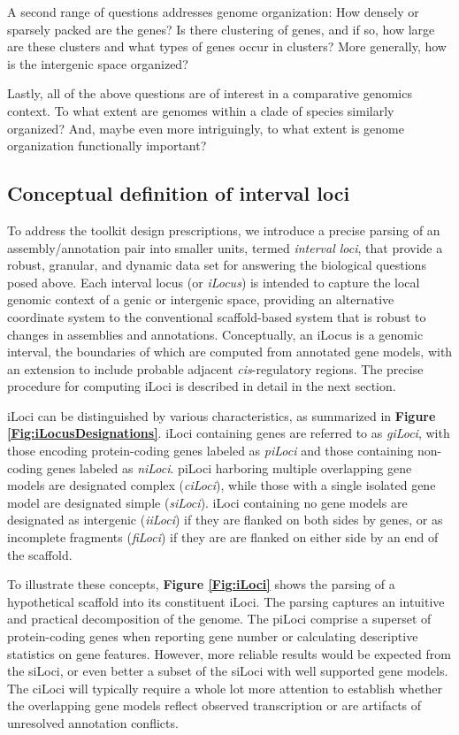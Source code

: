 A second range of questions addresses genome organization:
How densely or sparsely packed are the genes?
Is there clustering of genes, and if so, how large are these clusters and what types of genes occur in clusters?
More generally, how is the intergenic space organized?

Lastly, all of the above questions are of interest in a comparative genomics context.
To what extent are genomes within a clade of species similarly organized?
And, maybe even more intriguingly, to what extent is genome organization functionally important?


\subsection{Conceptual definition of interval loci}
To address the toolkit design prescriptions, we introduce a precise parsing of an assembly/annotation pair into smaller units, termed \textit{interval loci}, that provide a robust, granular, and dynamic data set for answering the biological questions posed above.
Each interval locus (or \textit{iLocus}) is intended to capture the local genomic context of a genic or intergenic space, providing an alternative coordinate system to the conventional scaffold-based system that is robust to changes in assemblies and annotations.
Conceptually, an iLocus is a genomic interval, the boundaries of which are computed from annotated gene models, with an extension to include probable adjacent \textit{cis}-regulatory regions.
The precise procedure for computing iLoci is described in detail in the next section.

iLoci can be distinguished by various characteristics, as summarized in \textbf{Figure \ref{Fig:iLocusDesignations}}.
iLoci containing genes are referred to as \textit{giLoci}, with those encoding protein-coding genes labeled as \textit{piLoci} and those containing non-coding genes labeled as \textit{niLoci}.
piLoci harboring multiple overlapping gene models are designated complex (\textit{ciLoci}), while those with a single isolated gene model are designated simple (\textit{siLoci}).
iLoci containing no gene models are designated as intergenic (\textit{iiLoci}) if they are flanked on both sides by genes, or as incomplete fragments (\textit{fiLoci}) if they are are flanked on either side by an end of the scaffold.

To illustrate these concepts, \textbf{Figure \ref{Fig:iLoci}} shows the parsing of a hypothetical scaffold into its constituent iLoci.
The parsing captures an intuitive and practical decomposition of the genome.
The piLoci comprise a superset of protein-coding genes when reporting gene number or calculating descriptive statistics on gene features.
However, more reliable results would be expected from the siLoci, or even better a subset of the siLoci with well supported gene models.
The ciLoci will typically require a whole lot more attention to establish whether the overlapping gene models reflect observed transcription or are artifacts of unresolved annotation conflicts.


